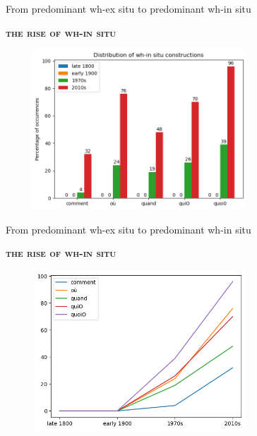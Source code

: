 \documentclass[lesson_slides]{subfiles}
\begin{document}
\begin{frame}[c]{From predominant wh-ex situ to predominant wh-in situ}

    \textbf{\textsc{the rise of wh-in situ}} \pause
    \begin{center}
        \includegraphics[width=10cm, height=6cm]{images/insitucolumns.png}
    \end{center}
  
\end{frame}
\begin{frame}[c]{From predominant wh-ex situ to predominant wh-in situ}

    \textbf{\textsc{the rise of wh-in situ}} \pause
    \begin{center}
        \includegraphics[width=10cm, height=6cm]{images/insitu.png}
    \end{center}
  
\end{frame}
\end{document}
